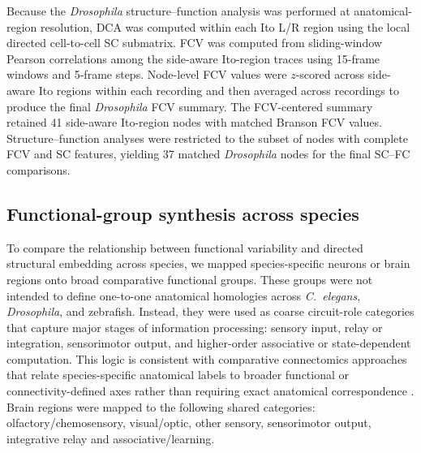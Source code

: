 \documentclass[9pt,twocolumn,twoside]{pnas-new}
\begin{document}
{Because the \textit{Drosophila} structure--function analysis was performed at anatomical-region resolution, $\mathrm{DCA}$ was computed within each Ito L/R region using the local directed cell-to-cell SC submatrix. FCV was computed from sliding-window Pearson correlations among the side-aware Ito-region traces using 15-frame windows and 5-frame steps. Node-level FCV values were $z$-scored across side-aware Ito regions within each recording and then averaged across recordings to produce the final \textit{Drosophila} FCV summary. The FCV-centered summary retained 41 side-aware Ito-region nodes with matched Branson FCV values. Structure--function analyses were restricted to the subset of nodes with complete FCV and SC features, yielding 37 matched \textit{Drosophila} nodes for the final SC--FC comparisons. 


\subsection*{Functional-group synthesis across species}

To compare the relationship between functional variability and directed structural embedding across species, we mapped species-specific neurons or brain regions onto broad comparative functional groups. These groups were not intended to define one-to-one anatomical homologies across \textit{C.~elegans}, \textit{Drosophila}, and zebrafish. Instead, they were used as coarse circuit-role categories that capture major stages of information processing: sensory input, relay or integration, sensorimotor output, and higher-order associative or state-dependent computation. This logic is consistent with comparative connectomics approaches that relate species-specific anatomical labels to broader functional or connectivity-defined axes rather than requiring exact anatomical correspondence \citep{Mars2018ConnectivityBlueprints,Xu2020CrossSpeciesAlignment,Margulies2016PrincipalGradient}. Brain regions were mapped to the following shared categories: olfactory/chemosensory, visual/optic, other sensory, sensorimotor output, integrative relay and  associative/learning.

}
\end{document}
